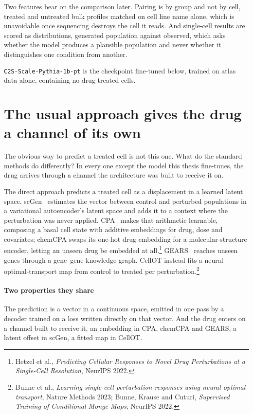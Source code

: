 Two features bear on the comparison later. Pairing is by group and not by cell,
treated and untreated bulk profiles matched on cell line name alone, which is
unavoidable once sequencing destroys the cell it reads. And single-cell results
are scored as distributions, generated population against observed, which asks
whether the model produces a plausible population and never whether it
distinguishes one condition from another.

\texttt{C2S-Scale-Pythia-1b-pt} is the checkpoint fine-tuned below, trained on
atlas data alone, containing no drug-treated cells.

\section{The usual approach gives the drug a channel of its own}
\label{sec:lit-chem}
\framedecl{-}

\begin{question}
The obvious way to predict a treated cell is not this one. What do the standard
methods do differently? In every one except the model this thesis fine-tunes, the
drug arrives through a channel the architecture was built to receive it on.
\end{question}

\noindent
The direct approach predicts a treated cell as a displacement in a learned
latent space. scGen~\cite{scgen} estimates the vector between control and
perturbed populations in a variational autoencoder's latent space and adds it to
a context where the perturbation was never applied. CPA~\cite{cpa} makes that
arithmetic learnable, composing a basal cell state with additive embeddings for
drug, dose and covariates; chemCPA swaps its one-hot drug embedding for a
molecular-structure encoder, letting an unseen drug be embedded at
all.\footnote{Hetzel et al., \emph{Predicting Cellular Responses to Novel Drug
Perturbations at a Single-Cell Resolution}, NeurIPS 2022.} GEARS~\cite{gears}
reaches unseen genes through a gene--gene knowledge graph. CellOT instead fits a
neural optimal-transport map from control to treated per perturbation.\footnote{
Bunne et al., \emph{Learning single-cell perturbation responses using neural
optimal transport}, Nature Methods 2023; Bunne, Krause and Cuturi,
\emph{Supervised Training of Conditional Monge Maps}, NeurIPS 2022.}

\paragraph{Two properties they share} The prediction is a vector in a continuous
space, emitted in one pass by a decoder trained on a loss written directly on
that vector. And the drug enters on a channel built to receive it, an embedding
in CPA, chemCPA and GEARS, a latent offset in scGen, a fitted map in CellOT.

